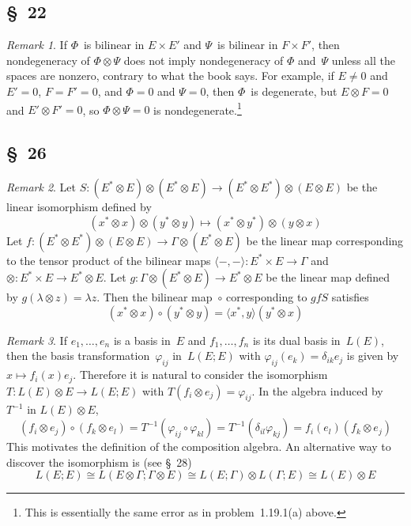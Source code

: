 \documentclass[letterpaper,12pt]{article}
\newcommand{\iso}{\cong}
\newcommand{\after}{\circ}
\newcommand{\cross}{\times}
\newcommand{\tprod}{\otimes}
\newcommand{\sprod}[2]{\langle#1,#2\rangle}
\theoremstyle{definition}
\theoremstyle{remark}
\newtheorem*{rmk}{Remark}
\begin{document}
\subsection*{\S~22}
\begin{rmk}
If \(\Phi\)~is bilinear in \(E\times E'\) and \(\Psi\)~is bilinear in \(F\times F'\), then nondegeneracy of \(\Phi\tprod\Psi\) does not imply nondegeneracy of \(\Phi\) and~\(\Psi\) unless all the spaces are nonzero, contrary to what the book says. For example, if \(E\ne 0\) and \(E'=0\), \(F=F'=0\), and \(\Phi=0\) and \(\Psi=0\), then \(\Phi\)~is degenerate, but \(E\tprod F=0\) and \(E'\tprod F'=0\), so \(\Phi\tprod\Psi=0\) is nondegenerate.\footnote{This is essentially the same error as in problem~1.19.1(a) above.}
\end{rmk}

\subsection*{\S~26}
\begin{rmk}
Let \(S:(E^*\tprod E)\tprod(E^*\tprod E)\to(E^*\tprod E^*)\tprod(E\tprod E)\) be the linear isomorphism defined by
\[(x^*\tprod x)\tprod(y^*\tprod y)\mapsto(x^*\tprod y^*)\tprod(y\tprod x)\]
Let \(f:(E^*\tprod E^*)\tprod(E\tprod E)\to\Gamma\tprod(E^*\tprod E)\) be the linear map corresponding to the tensor product of the bilinear maps \(\sprod{-}{-}:E^*\cross E\to\Gamma\) and \(\tprod:E^*\cross E\to E^*\tprod E\). Let \(g:\Gamma\tprod(E^*\tprod E)\to E^*\tprod E\) be the linear map defined by \(g(\lambda\tprod z)=\lambda z\). Then the bilinear map~\({\after}\) corresponding to \(gfS\) satisfies
\[(x^*\tprod x)\after(y^*\tprod y)=\sprod{x^*}{y}(y^*\tprod x)\]
\end{rmk}

\begin{rmk}
If \(e_1,\ldots,e_n\) is a basis in~\(E\) and \(f_1,\ldots,f_n\) is its dual basis in~\(L(E)\), then the basis transformation~\(\varphi_{ij}\) in~\(L(E;E)\) with \(\varphi_{ij}(e_k)=\delta_{ik}e_j\) is given by \(x\mapsto f_i(x)e_j\). Therefore it is natural to consider the isomorphism \(T:L(E)\tprod E\to L(E;E)\) with \(T(f_i\tprod e_j)=\varphi_{ij}\). In the algebra induced by~\(T^{-1}\) in \(L(E)\tprod E\),
\[(f_i\tprod e_j)\after(f_k\tprod e_l)=T^{-1}(\varphi_{ij}\after\varphi_{kl})=T^{-1}(\delta_{il}\varphi_{kj})=f_i(e_l)(f_k\tprod e_j)\]
This motivates the definition of the composition algebra. An alternative way to discover the isomorphism is (see \S~28)
\[L(E;E)\iso L(E\tprod\Gamma;\Gamma\tprod E)\iso L(E;\Gamma)\tprod L(\Gamma;E)\iso L(E)\tprod E\]
\end{rmk}
\end{document}
